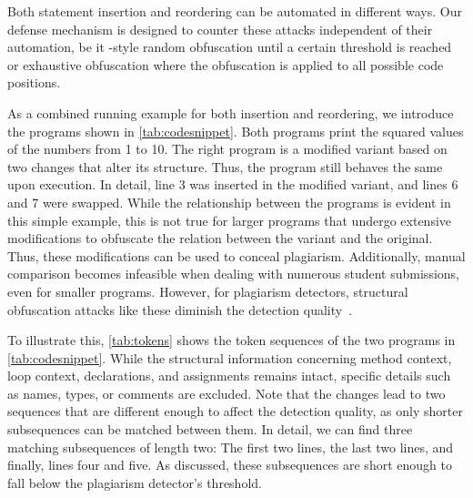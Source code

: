 Both statement insertion and reordering can be automated in different ways. Our defense mechanism is designed to counter these attacks independent of their automation, be it \mossad-style random obfuscation until a certain threshold is reached or exhaustive obfuscation where the obfuscation is applied to all possible code positions.

\noindent
As a combined running example for both insertion and reordering, we introduce the programs shown in \autoref{tab:codesnippet}. 
Both programs print the squared values of the numbers from 1 to 10.
The right program is a modified variant based on two changes that alter its structure.
Thus, the program still behaves the same upon execution.
In detail, line 3 was inserted in the modified variant, and lines 6 and 7 were swapped.
While the relationship between the programs is evident in this simple example, this is not true for larger programs that undergo extensive modifications to obfuscate the relation between the variant and the original. Thus, these modifications can be used to conceal plagiarism. 
Additionally, manual comparison becomes infeasible when dealing with numerous student submissions, even for smaller programs.
However, for plagiarism detectors, structural obfuscation attacks like these diminish the detection quality~\cite{DevoreMcDonald2020}. 

To illustrate this, \autoref{tab:tokens} shows the token sequences of the two programs in \autoref{tab:codesnippet}.
While the structural information concerning method context, loop context, declarations, and assignments remains intact, specific details such as names, types, or comments are excluded.
Note that the changes lead to two sequences that are different enough to affect the detection quality, as only shorter subsequences can be matched between them. In detail, we can find three matching subsequences of length two: The first two lines, the last two lines, and finally, lines four and five. As discussed, these subsequences are short enough to fall below the plagiarism detector's threshold.

